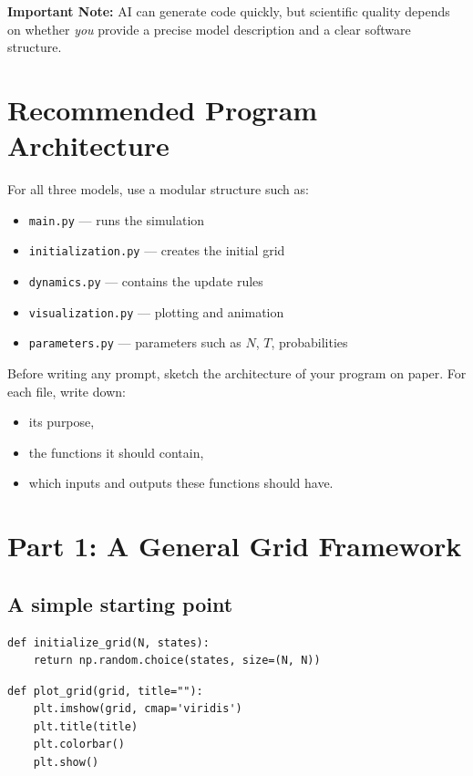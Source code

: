 \documentclass[paper=letter, fontsize=12pt]{article}
\numberwithin{equation}{section}
\begin{document}
\textbf{Important Note:} AI can generate code quickly, but scientific quality depends on whether \emph{you} provide a precise model description and a clear software structure.

\section*{Recommended Program Architecture}
For all three models, use a modular structure such as:
\begin{itemize}
\item \texttt{main.py} --- runs the simulation
\item \texttt{initialization.py} --- creates the initial grid
\item \texttt{dynamics.py} --- contains the update rules
\item \texttt{visualization.py} --- plotting and animation
\item \texttt{parameters.py} --- parameters such as $N$, $T$, probabilities
\end{itemize}

\begin{taskbox}
Before writing any prompt, sketch the architecture of your program on paper. For each file, write down:
\begin{itemize}
\item its purpose,
\item the functions it should contain,
\item which inputs and outputs these functions should have.
\end{itemize}
\end{taskbox}

\section*{Part 1: A General Grid Framework}

\subsection*{A simple starting point}

\begin{lstlisting}
def initialize_grid(N, states):
    return np.random.choice(states, size=(N, N))
\end{lstlisting}

\begin{lstlisting}
def plot_grid(grid, title=""):
    plt.imshow(grid, cmap='viridis')
    plt.title(title)
    plt.colorbar()
    plt.show()
\end{lstlisting}
\end{document}
